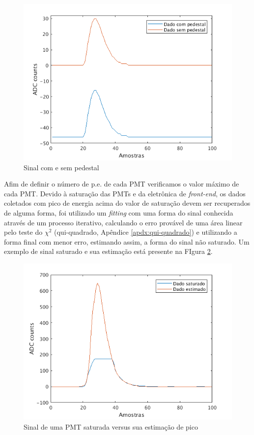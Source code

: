\begin{figure}[H]
	\centering
	\includegraphics[width=14cm]{textuais/dadosreais/figuras/pedestal.png}
	\caption{Sinal com e sem pedestal}
	\label{fig:pedestal}
\end{figure}

Afim de definir o número de p.e. de cada PMT verificamos o valor máximo de cada PMT. Devido à saturação das PMTs e da eletrônica de \emph{front-end}, os dados coletados com pico de energia acima do valor de saturação devem ser recuperados de alguma forma, foi utilizado um \emph{fitting} com uma forma do sinal conhecida através de um processo iterativo, calculando o erro provável de uma área linear pelo teste do $\chi^2$ (qui-quadrado, Apêndice \ref{apdx:qui-quadrado}) e utilizando a forma final com menor erro, estimando assim, a forma do sinal não saturado. Um exemplo de sinal saturado e sua estimação está presente na FIgura \ref{fig:saturado}.

\begin{figure}[H]
	\centering
	\includegraphics[width=14cm]{textuais/dadosreais/figuras/saturado.png}
	\caption{Sinal de uma PMT saturada versus sua estimação de pico}
	\label{fig:saturado}
\end{figure}


